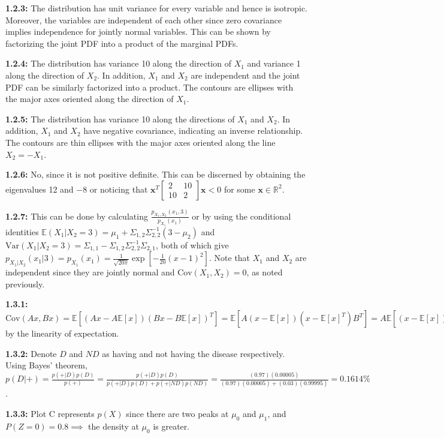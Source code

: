 \documentclass[12pt]{article}
\newcommand{\C}{\text{Cov}}
\newcommand{\E}{\mathbb{E}}
\newcommand{\m}[1]{\mathbf{#1}}
\newcommand{\R}{\mathbb{R}}
\begin{document}
\textbf{1.2.3:} The distribution has unit variance for every variable and hence is isotropic. Moreover, the variables are independent of each other since zero covariance implies independence for jointly normal variables. This can be shown by factorizing the joint PDF into a product of the marginal PDFs.

\textbf{1.2.4:} The distribution has variance 10 along the direction of $X_1$ and variance 1 along the direction of $X_2$. In addition, $X_1$ and $X_2$ are independent and the joint PDF can be similarly factorized into a product. The contours are ellipses with the major axes oriented along the direction of $X_1$.

\textbf{1.2.5:} The distribution has variance 10 along the directions of $X_1$ and $X_2$. In addition, $X_1$ and $X_2$ have negative covariance, indicating an inverse relationship. The contours are thin ellipses with the major axes oriented along the line $X_2=-X_1$.

\textbf{1.2.6:} No, since it is not positive definite. This can be discerned by obtaining the eigenvalues 12 and $-8$ or noticing that $\m x^T\begin{bmatrix} 2 & 10 \\ 10 & 2 \end{bmatrix}\m x<0$ for some $\m x\in\R^2$.

\textbf{1.2.7:} This can be done by calculating $\frac{p_{X_1,X_2}(x_1,3)}{p_{X_1}(x_1)}$ or by using the conditional identities $\E(X_1|X_2=3)=\mu_1+\Sigma_{1,2}\Sigma_{2,2}^{-1}(3-\mu_2)$ and $\text{Var}(X_1|X_2=3)=\Sigma_{1,1}-\Sigma_{1,2}\Sigma_{2,2}^{-1}\Sigma_{2,1}$, both of which give $p_{X_1|X_2}(x_1|3)=p_{X_1}(x_1)=\frac{1}{\sqrt{20\pi}}\exp[-\frac{1}{20}(x-1)^2]$. Note that $X_1$ and $X_2$ are independent since they are jointly normal and $\C(X_1,X_2)=0$, as noted previously.

\textbf{1.3.1:} $\C(Ax,Bx)=\E[(Ax-A\E[x])(Bx-B\E[x])^T]=\E[A(x-\E[x])(x-\E[x]^T)B^T]=A\E[(x-\E[x])(x-\E[x]^T)]B^T=A\C(x)B^T$ by the linearity of expectation.

\textbf{1.3.2:} Denote $D$ and $ND$ as having and not having the disease respectively. Using Bayes' theorem, $p(D|+)=\frac{p(+|D)p(D)}{p(+)}=\frac{p(+|D)p(D)}{p(+|D)p(D)+p(+|ND)p(ND)}=\frac{(0.97)(0.00005)}{(0.97)(0.00005)+(0.03)(0.99995)}=0.1614\%$.

\textbf{1.3.3:} Plot C represents $p(X)$ since there are two peaks at $\mu_0$ and $\mu_1$, and $P(Z=0)=0.8\implies$ the density at $\mu_0$ is greater.
\end{document}
